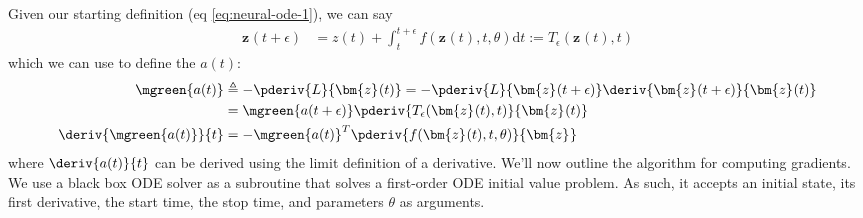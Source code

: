 \documentclass[11pt]{article}
\renewcommand\vec[2][]{\bm{#2}_{#1}}
\begin{document}
Given our starting definition (eq \ref{eq:neural-ode-1}), we can say
\begin{align}
	\vec z (t + \epsilon) 
		&= z(t) + \int_t^{t + \epsilon} f\left(\vec{z}\left(t \right), t, \theta	 \right) \mathrm{d}t 
		:= T_\epsilon (\vec z (t), t)  
\end{align}
which we can use to define the  $a(t)$:
\begin{align}
	\mgreen{a(t)}
		&\triangleq - \pderiv{L}{\vec z (t)} = -  \pderiv{L}{\vec z (t + \epsilon)} \deriv{\vec z (t + \epsilon)}{\vec z (t)} \\
		&= \mgreen{a(t + \epsilon)} \pderiv{T_\epsilon (\vec z (t), t)}{\vec z (t)} \\
	\deriv{\mgreen{a(t)}}{t}
		&= - \mgreen{a(t)}^T \pderiv{ f(\vec z (t), t, \theta) }{\vec z}
\end{align}
where $\deriv{a(t)}{t}$ can be derived using the limit definition of a derivative. We'll now outline the algorithm for computing gradients. We use a black box ODE solver as a subroutine that solves a first-order ODE initial value problem. As such, it accepts an initial state, its first derivative, the start time, the stop time, and parameters $\theta$ as arguments. 
\end{document}
